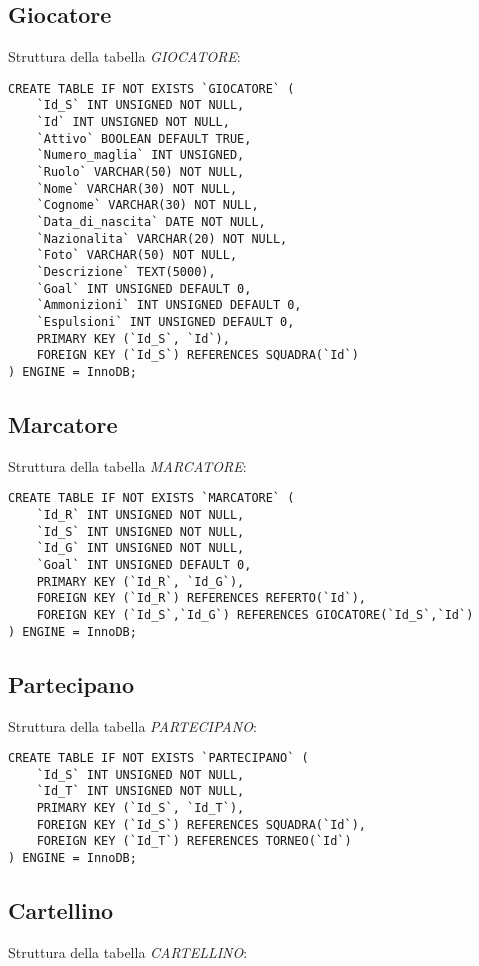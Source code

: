 \subsection{Giocatore}
Struttura della tabella \emph{GIOCATORE}:

\begin{lstlisting}
CREATE TABLE IF NOT EXISTS `GIOCATORE` (
	`Id_S` INT UNSIGNED NOT NULL,
	`Id` INT UNSIGNED NOT NULL,
	`Attivo` BOOLEAN DEFAULT TRUE,
	`Numero_maglia` INT UNSIGNED,
	`Ruolo` VARCHAR(50) NOT NULL,
	`Nome` VARCHAR(30) NOT NULL,
	`Cognome` VARCHAR(30) NOT NULL,
	`Data_di_nascita` DATE NOT NULL,
	`Nazionalita` VARCHAR(20) NOT NULL,
	`Foto` VARCHAR(50) NOT NULL,
	`Descrizione` TEXT(5000),
	`Goal` INT UNSIGNED DEFAULT 0,
	`Ammonizioni` INT UNSIGNED DEFAULT 0,
	`Espulsioni` INT UNSIGNED DEFAULT 0,
	PRIMARY KEY (`Id_S`, `Id`),
	FOREIGN KEY (`Id_S`) REFERENCES SQUADRA(`Id`)
) ENGINE = InnoDB;
\end{lstlisting}

\newpage

\subsection{Marcatore}
Struttura della tabella \emph{MARCATORE}:

\begin{lstlisting}
CREATE TABLE IF NOT EXISTS `MARCATORE` (
	`Id_R` INT UNSIGNED NOT NULL,
	`Id_S` INT UNSIGNED NOT NULL,
	`Id_G` INT UNSIGNED NOT NULL,
	`Goal` INT UNSIGNED DEFAULT 0,
	PRIMARY KEY (`Id_R`, `Id_G`),
	FOREIGN KEY (`Id_R`) REFERENCES REFERTO(`Id`),
	FOREIGN KEY (`Id_S`,`Id_G`) REFERENCES GIOCATORE(`Id_S`,`Id`)
) ENGINE = InnoDB;
\end{lstlisting}

\subsection{Partecipano}
Struttura della tabella \emph{PARTECIPANO}:

\begin{lstlisting}
CREATE TABLE IF NOT EXISTS `PARTECIPANO` (
	`Id_S` INT UNSIGNED NOT NULL,
	`Id_T` INT UNSIGNED NOT NULL,
	PRIMARY KEY (`Id_S`, `Id_T`),
	FOREIGN KEY (`Id_S`) REFERENCES SQUADRA(`Id`),
	FOREIGN KEY (`Id_T`) REFERENCES TORNEO(`Id`)
) ENGINE = InnoDB;
\end{lstlisting}

\subsection{Cartellino}
Struttura della tabella \emph{CARTELLINO}:

